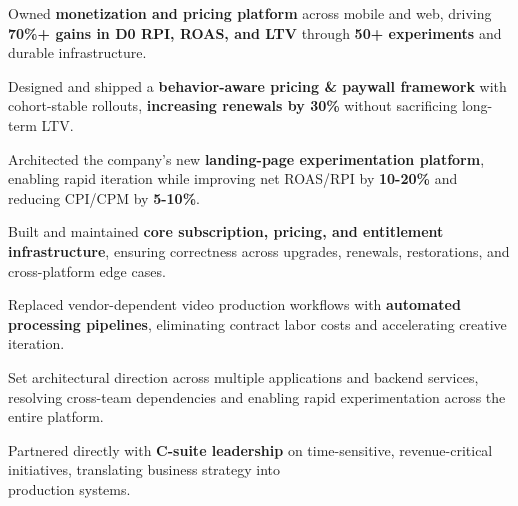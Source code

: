 \documentclass[10pt,a4paper]{resume}
\begin{document}
\vspace{6px}
\begin{highlights}
    \item Owned \textbf{monetization and pricing platform} across mobile and web, driving \textbf{70\%+ gains in D0 RPI, ROAS, and LTV} through \textbf{50+ experiments} and durable infrastructure.
    \item Designed and shipped a \textbf{behavior-aware pricing \& paywall framework} with cohort-stable rollouts, \textbf{increasing renewals by 30\%} without sacrificing long-term LTV.
    \item Architected the company's new \textbf{landing-page experimentation platform}, enabling rapid iteration while improving net ROAS/RPI by \textbf{10-20\%} and reducing CPI/CPM by \textbf{5-10\%}.
    \item Built and maintained \textbf{core subscription, pricing, and entitlement infrastructure}, ensuring correctness across upgrades, renewals, restorations, and cross-platform edge cases.
    \item Replaced vendor-dependent video production workflows with \textbf{automated processing pipelines}, eliminating contract labor costs and accelerating creative iteration.
    \item Set architectural direction across multiple applications and backend services, resolving cross-team dependencies and enabling rapid experimentation across the entire platform.
    \item Partnered directly with \textbf{C-suite leadership} on time-sensitive, revenue-critical initiatives, translating business strategy into\\production systems.
\end{highlights}
\divider
\end{document}
